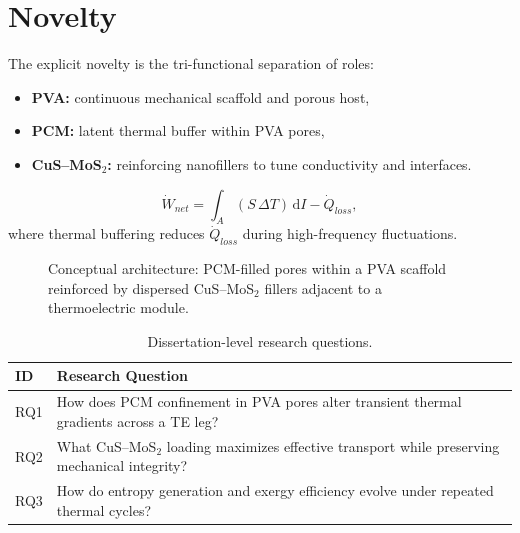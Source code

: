 \section{Novelty}
The explicit novelty is the tri-functional separation of roles:
\begin{itemize}
    \item \textbf{PVA:} continuous mechanical scaffold and porous host,
    \item \textbf{PCM:} latent thermal buffer within PVA pores,
    \item \textbf{CuS--MoS$_2$:} reinforcing nanofillers to tune conductivity and interfaces.
\end{itemize}

\begin{equation}\label{eq:intro_power_balance}
\dot{W}_{net}=\int_{A}\left(S\,\Delta T\right)\,\mathrm{d}I-\dot{Q}_{loss},
\end{equation}
where thermal buffering reduces $\dot{Q}_{loss}$ during high-frequency fluctuations.

\begin{figure}[htbp]
\centering
{}
\caption{Conceptual architecture: PCM-filled pores within a PVA scaffold reinforced by dispersed CuS--MoS$_2$ fillers adjacent to a thermoelectric module.}
\label{fig:intro_architecture}
\end{figure}

\begin{table}[htbp]
\centering
\caption{Dissertation-level research questions.}
\label{tab:intro_questions}
\begin{tabular}{p{1.2cm}p{11.2cm}}
\toprule
ID & Research Question \\
\midrule
RQ1 & How does PCM confinement in PVA pores alter transient thermal gradients across a TE leg? \\
RQ2 & What CuS--MoS$_2$ loading maximizes effective transport while preserving mechanical integrity? \\
RQ3 & How do entropy generation and exergy efficiency evolve under repeated thermal cycles? \\
\bottomrule
\end{tabular}
\end{table}

